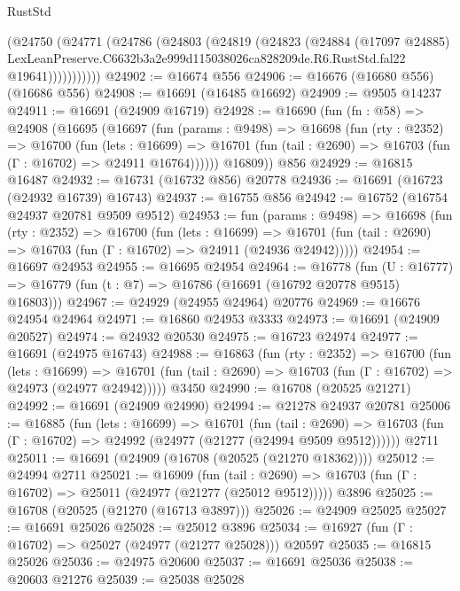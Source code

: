 \begin{lexlean}{RustStd}
\begin{coremodule}
            (@24750
              (@24771
                (@24786
                  (@24803
                    (@24819
                      (@24823
                        (@24884
                          (@17097 @24885)
                          LexLeanPreserve.C6632b3a2e999d115038026ca828209de.R6.RustStd.fal22
                          @19641)))))))))))
@24902 := @16674 @556
@24906 := @16676 (@16680 @556) (@16686 @556)
@24908 := @16691 (@16485 @16692)
@24909 := @9505 @14237
@24911 := @16691 (@24909 @16719)
@24928 := @16690
    (fun (fn : @58) =>
    @24908
      (@16695
        (@16697
          (fun (params : @9498) =>
          @16698
            (fun (rty : @2352) =>
            @16700
              (fun (lets : @16699) =>
              @16701 (fun (tail : @2690) => @16703 (fun (Γ : @16702) => @24911 @16764))))))
        @16809))
    @856
@24929 := @16815 @16487
@24932 := @16731 (@16732 @856) @20778
@24936 := @16691 (@16723 (@24932 @16739) @16743)
@24937 := @16755 @856
@24942 := @16752 (@16754 @24937 @20781 @9509 @9512)
@24953 := fun (params : @9498) =>
  @16698
    (fun (rty : @2352) =>
    @16700
      (fun (lets : @16699) =>
      @16701 (fun (tail : @2690) => @16703 (fun (Γ : @16702) => @24911 (@24936 @24942)))))
@24954 := @16697 @24953
@24955 := @16695 @24954
@24964 := @16778
    (fun (U : @16777) => @16779 (fun (t : @7) => @16786 (@16691 (@16792 @20778 @9515) @16803)))
@24967 := @24929 (@24955 @24964) @20776
@24969 := @16676 @24954 @24964
@24971 := @16860 @24953 @3333
@24973 := @16691 (@24909 @20527)
@24974 := @24932 @20530
@24975 := @16723 @24974
@24977 := @16691 (@24975 @16743)
@24988 := @16863
    (fun (rty : @2352) =>
    @16700
      (fun (lets : @16699) =>
      @16701 (fun (tail : @2690) => @16703 (fun (Γ : @16702) => @24973 (@24977 @24942)))))
    @3450
@24990 := @16708 (@20525 @21271)
@24992 := @16691 (@24909 @24990)
@24994 := @21278 @24937 @20781
@25006 := @16885
    (fun (lets : @16699) =>
    @16701
      (fun (tail : @2690) =>
      @16703 (fun (Γ : @16702) => @24992 (@24977 (@21277 (@24994 @9509 @9512))))))
    @2711
@25011 := @16691 (@24909 (@16708 (@20525 (@21270 @18362))))
@25012 := @24994 @2711
@25021 := @16909
    (fun (tail : @2690) => @16703 (fun (Γ : @16702) => @25011 (@24977 (@21277 (@25012 @9512)))))
    @3896
@25025 := @16708 (@20525 (@21270 (@16713 @3897)))
@25026 := @24909 @25025
@25027 := @16691 @25026
@25028 := @25012 @3896
@25034 := @16927 (fun (Γ : @16702) => @25027 (@24977 (@21277 @25028))) @20597
@25035 := @16815 @25026
@25036 := @24975 @20600
@25037 := @16691 @25036
@25038 := @20603 @21276
@25039 := @25038 @25028

\end{coremodule}
\end{lexlean}
